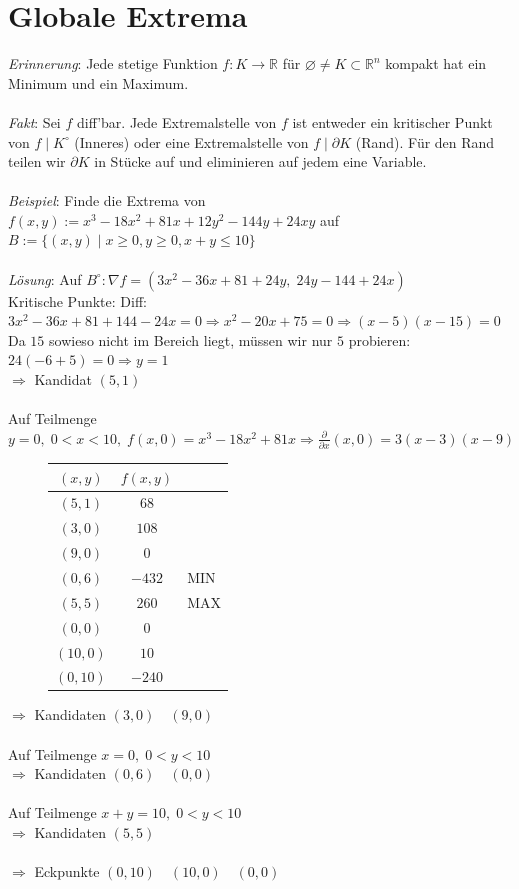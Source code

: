\documentclass[12pt,a4paper,titlepage]{article}
\renewcommand{\d}{\partial}
\newcommand{\setR}{\mathbb{R}}
\begin{document}
\section*{Globale Extrema}
\textit{Erinnerung}: Jede stetige Funktion $f:K\to\setR$ für $\varnothing\neq K\subset\setR^n$ kompakt hat ein Minimum und ein Maximum. \\
\\
\textit{Fakt}: Sei $f$ diff'bar. Jede Extremalstelle von $f$ ist entweder ein kritischer Punkt von $f\mid K^\circ$ (Inneres) oder eine Extremalstelle von $f\mid\d K$ (Rand). Für den Rand teilen wir $\d K$ in Stücke auf und eliminieren auf jedem eine Variable. \\
\\
\textit{Beispiel}: Finde die Extrema von $f(x,y):=x^3-18x^2+81x+12y^2-144y+24xy$ auf $B:=\{(x,y)\mid x\geq 0,y\geq 0,x+y\leq 10\}$ \\
\\
\textit{Lösung}: Auf $B^\circ: \nabla f=(3x^2-36x+81+24y,\; 24y-144+24x)$ \\
Kritische Punkte: Diff: $3x^2-36x+81+144-24x=0 \Rightarrow x^2-20x+75=0 \Rightarrow (x-5)(x-15)=0$ \\
Da $15$ sowieso nicht im Bereich liegt, müssen wir nur $5$ probieren: $24(-6+5)=0 \Rightarrow y=1$ \\
$\Rightarrow$ Kandidat $(5,1)$ \\
\\
Auf Teilmenge $y=0,\; 0<x<10,\; f(x,0)=x^3-18x^2+81x \Rightarrow \frac{\d}{\d x}(x,0)=3(x-3)(x-9)$
\begin{figure}
  \centering
  \begin{tabular}{c|c|l}
    $(x,y)$ & $f(x,y)$ & \\
    \hline
    $(5,1)$ & $68$ & \\
    $(3,0)$ & $108$ & \\
    $(9,0)$ & $0$ & \\
    $(0,6)$ & $-432$ & MIN\\
    $(5,5)$ & $260$ & MAX\\
    $(0,0)$ & $0$ & \\
    $(10,0)$ & $10$ & \\
    $(0,10)$ & $-240$ &
  \end{tabular}
\end{figure}
$\Rightarrow$ Kandidaten $(3,0)\quad(9,0)$ \\
\\
Auf Teilmenge $x=0,\; 0<y<10 $ \\
$\Rightarrow$ Kandidaten $(0,6)\quad(0,0)$ \\
\\
Auf Teilmenge $x+y=10,\; 0<y<10 $ \\
$\Rightarrow$ Kandidaten $(5,5)$ \\
\\
$\Rightarrow$ Eckpunkte $(0,10)\quad(10,0)\quad(0,0)$ \\
\end{document}
